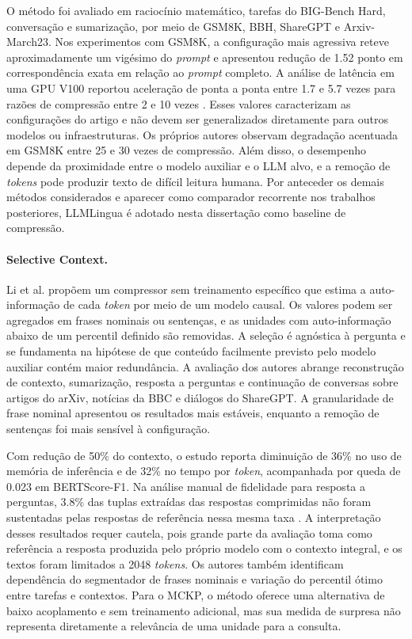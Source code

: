 O método foi avaliado em raciocínio matemático, tarefas do BIG-Bench Hard, conversação e sumarização, por meio de GSM8K, BBH, ShareGPT e Arxiv-March23. Nos experimentos com GSM8K, a configuração mais agressiva reteve aproximadamente um vigésimo do \textit{prompt} e apresentou redução de 1.52 ponto em correspondência exata em relação ao \textit{prompt} completo. A análise de latência em uma GPU V100 reportou aceleração de ponta a ponta entre 1.7 e 5.7 vezes para razões de compressão entre 2 e 10 vezes \cite{jiang2023llmlingua}. Esses valores caracterizam as configurações do artigo e não devem ser generalizados diretamente para outros modelos ou infraestruturas. Os próprios autores observam degradação acentuada em GSM8K entre 25 e 30 vezes de compressão. Além disso, o desempenho depende da proximidade entre o modelo auxiliar e o LLM alvo, e a remoção de \textit{tokens} pode produzir texto de difícil leitura humana. Por anteceder os demais métodos considerados e aparecer como comparador recorrente nos trabalhos posteriores, LLMLingua é adotado nesta dissertação como baseline de compressão.

\paragraph{Selective Context.}
Li et al. \cite{li2023selective} propõem um compressor sem treinamento específico que estima a auto-informação de cada \textit{token} por meio de um modelo causal. Os valores podem ser agregados em frases nominais ou sentenças, e as unidades com auto-informação abaixo de um percentil definido são removidas. A seleção é agnóstica à pergunta e se fundamenta na hipótese de que conteúdo facilmente previsto pelo modelo auxiliar contém maior redundância. A avaliação dos autores abrange reconstrução de contexto, sumarização, resposta a perguntas e continuação de conversas sobre artigos do arXiv, notícias da BBC e diálogos do ShareGPT. A granularidade de frase nominal apresentou os resultados mais estáveis, enquanto a remoção de sentenças foi mais sensível à configuração.

Com redução de 50\% do contexto, o estudo reporta diminuição de 36\% no uso de memória de inferência e de 32\% no tempo por \textit{token}, acompanhada por queda de 0.023 em BERTScore-F1. Na análise manual de fidelidade para resposta a perguntas, 3.8\% das tuplas extraídas das respostas comprimidas não foram sustentadas pelas respostas de referência nessa mesma taxa \cite{li2023selective}. A interpretação desses resultados requer cautela, pois grande parte da avaliação toma como referência a resposta produzida pelo próprio modelo com o contexto integral, e os textos foram limitados a 2048 \textit{tokens}. Os autores também identificam dependência do segmentador de frases nominais e variação do percentil ótimo entre tarefas e contextos. Para o MCKP, o método oferece uma alternativa de baixo acoplamento e sem treinamento adicional, mas sua medida de surpresa não representa diretamente a relevância de uma unidade para a consulta.


